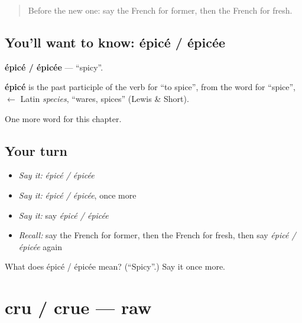 \label{lesson:FR-C161-epice-epicee}



\begin{quote}
Before the new one: say the French for former, then the French for fresh.
\end{quote}

\subsection*{You'll want to know: épicé / épicée}
\textbf{épicé / épicée} — \textquotedblleft{}spicy\textquotedblright{}.

\begin{cousinweb}
\textbf{épicé} is the past participle of the verb for \textquotedblleft{}to spice\textquotedblright{}, from the word for \textquotedblleft{}spice\textquotedblright{}, $\leftarrow$ Latin \emph{species}, \textquotedblleft{}wares, spices\textquotedblright{} (Lewis \& Short).
\end{cousinweb}

\begin{grammarlens}[title={What you've built}]
One more word for this chapter.
\end{grammarlens}

\subsection*{Your turn}
\begin{itemize}
\raggedright
  \item \emph{Say it:} \emph{épicé / épicée}
  \item \emph{Say it:} \emph{épicé / épicée}, once more
  \item \emph{Say it:} say \emph{épicé / épicée}
  \item \emph{Recall:} say the French for former, then the French for fresh, then say \emph{épicé / épicée} again
\end{itemize}

\begin{tcolorbox}[breakable,colback=teal!4,colframe=teal!35!black,title={Before you move on}]
What does épicé / épicée mean? (\textquotedblleft{}Spicy\textquotedblright{}.) Say it once more.
\end{tcolorbox}
\section[cru / crue]{cru / crue — raw}

